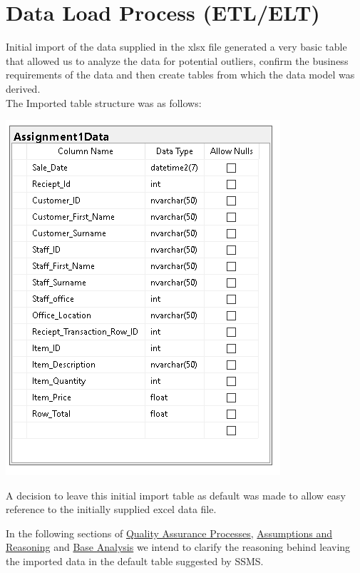 \documentclass{article}
\begin{document}
    \newpage
    \section{Data Load Process (ETL/ELT)}
        Initial import of the data supplied in the xlsx file generated a very basic table
        that allowed us to analyze the data for potential outliers, confirm the business
        requirements of the data and then create tables from which the data model was derived.
        \\
        The Imported table structure was as follows:
        \begin{center}
            \includegraphics{Images/Initial_Import.PNG}
        \end{center}

        A decision to leave this initial import table as default
        was made to allow easy reference to the initially supplied
        excel data file.
        \par
        In the following sections of \hyperref[sec:QAP]{\color{blue}Quality Assurance Processes}, \hyperref[sec:AR]{\color{blue}Assumptions and Reasoning} and \hyperref[sec:BA]{\color{blue}Base Analysis} we intend to clarify the reasoning behind leaving the imported data in
        the default table suggested by SSMS.

        \newpage
\end{document}
